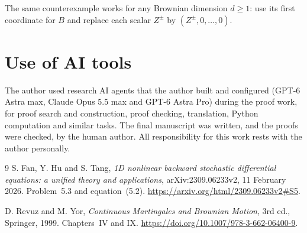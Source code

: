 \documentclass[11pt]{article}
\begin{document}
The same counterexample works for any Brownian dimension $d\ge1$:
use its first coordinate for $B$ and replace each scalar $Z^\pm$ by
$(Z^\pm,0,\ldots,0)$.

\section*{Use of AI tools}
The author used research AI agents that the author built and configured (GPT-6 Astra max,
Claude Opus 5.5 max and GPT-6 Astra Pro) during the proof work, for proof search and
construction, proof checking, translation, Python computation and similar tasks. The final
manuscript was written, and the proofs were checked, by the human author. All responsibility
for this work rests with the author personally.

\begin{thebibliography}{9}
S. Fan, Y. Hu and S. Tang,
\emph{1D nonlinear backward stochastic differential equations:
a unified theory and applications}, arXiv:2309.06233v2,
11 February 2026. Problem~5.3 and equation~(5.2).
\url{https://arxiv.org/html/2309.06233v2#S5}.

D. Revuz and M. Yor,
\emph{Continuous Martingales and Brownian Motion},
3rd ed., Springer, 1999. Chapters~IV and IX.
\url{https://doi.org/10.1007/978-3-662-06400-9}.
\end{thebibliography}
\end{document}
